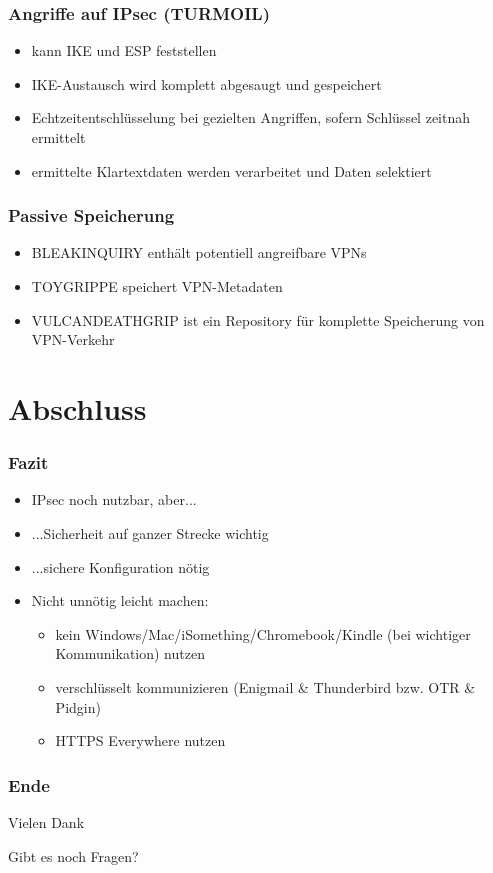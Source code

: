 \documentclass[t]{beamer}
\begin{document}
{

}

\begin{frame}
	\frametitle{Angriffe auf IPsec (TURMOIL)}
	\begin{itemize}
		\item kann IKE und ESP feststellen
		\item IKE-Austausch wird komplett abgesaugt und gespeichert
		\item Echtzeitentschlüsselung bei gezielten Angriffen, sofern Schlüssel zeitnah ermittelt
		\item ermittelte Klartextdaten werden verarbeitet und Daten selektiert
	\end{itemize}
\end{frame}

\begin{frame}
	\frametitle{Passive Speicherung}
	\begin{itemize}
		\item BLEAKINQUIRY enthält potentiell angreifbare VPNs
		\item TOYGRIPPE speichert VPN-Metadaten
		\item VULCANDEATHGRIP ist ein Repository für komplette Speicherung von VPN-Verkehr
	\end{itemize}
\end{frame}

\section{Abschluss}
\begin{frame}
	\frametitle{Fazit}
	\begin{itemize}
		\item IPsec noch nutzbar, aber...
		\item ...Sicherheit auf ganzer Strecke wichtig
		\item ...sichere Konfiguration nötig
		\item Nicht unnötig leicht machen:
			\begin{itemize}
				\item kein Windows/Mac/iSomething/Chromebook/Kindle (bei wichtiger Kommunikation) nutzen
				\item verschlüsselt kommunizieren (Enigmail \& Thunderbird bzw. OTR \& Pidgin)
				\item HTTPS Everywhere nutzen
			\end{itemize}
	\end{itemize}
\end{frame}

\begin{frame}[c]
	\frametitle{Ende}
	\centering
	Vielen Dank
	
	Gibt es noch Fragen?
\end{frame}
\end{document}
